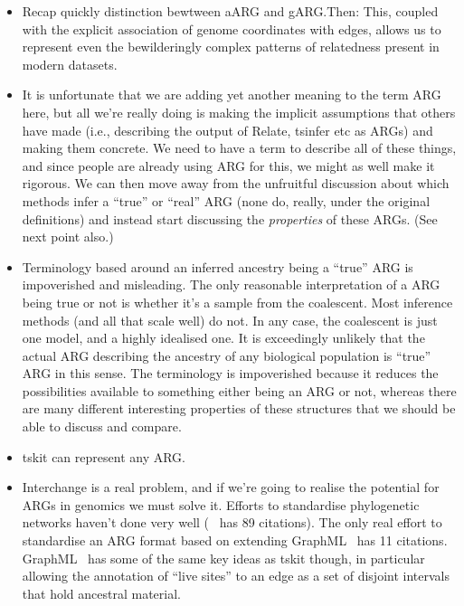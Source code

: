\documentclass{article}
\begin{document}
\begin{itemize}

\item Recap quickly distinction bewtween aARG and gARG.Then:
    This, coupled with
    the explicit association of genome coordinates with edges, allows
    us to represent even the bewilderingly complex patterns of relatedness
    present in modern datasets.


\item It is unfortunate that we are adding yet another meaning to the
term ARG here, but all we're really doing is making the implicit
assumptions that others have made (i.e., describing the output of
Relate, tsinfer etc as ARGs) and making them concrete. We need to have a
term to describe all of these things, and since people are already using
ARG for this, we might as well make it rigorous. We can then move away
from the unfruitful discussion about which methods infer a ``true'' or
``real'' ARG (none do, really, under the original definitions) and
instead start discussing the \emph{properties} of these ARGs. (See
next point also.)
\item Terminology based around an inferred ancestry being a ``true''
ARG is impoverished and misleading. The only reasonable interpretation
of a ARG being true or not is whether it's a sample from the coalescent.
Most inference methods (and all that scale well) do not. In any case,
the coalescent is just one model, and a highly idealised one. It is
exceedingly unlikely that the actual ARG describing the ancestry
of any biological population is ``true'' ARG in this sense. The terminology is
impoverished because it reduces the possibilities available
to something either being an ARG or not, whereas there are many different
interesting properties of these structures that we should be able to
discuss and compare.
\item tskit can represent any ARG.
\item Interchange is a real problem, and if we're going to realise the
potential for ARGs in genomics we must solve it. Efforts to standardise
phylogenetic networks haven't done very well (~\citep{cardona2008extended}
has 89 citations). The only real effort to standardise an ARG format
based on extending GraphML~\citep{mcgill2013graphml} has 11 citations.
GraphML~\citep{mcgill2013graphml} has some of the same key ideas
as tskit though, in particular allowing the annotation of ``live sites''
to an edge as a set of disjoint intervals that hold ancestral material.


\end{itemize}
\end{document}
